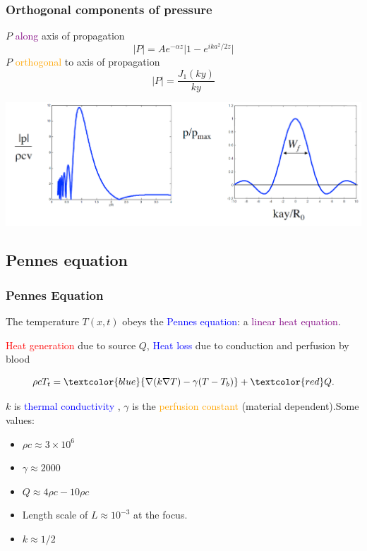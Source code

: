 \documentclass{beamer}
\begin{document}
\begin{frame}
\frametitle{Orthogonal components of pressure}

$P$ \textcolor{purple}{along} axis of propagation
$$ |P| = Ae^{-\alpha z} \big|1-e^{i k a^2/2z}\big| $$
$P$ \textcolor{orange}{orthogonal} to axis of propagation
$$ |P| = \frac{J_1(ky)}{ky} $$

\begin{center}
\includegraphics[scale=0.15]{Pages/transducer2731.pdf}
\end{center}

\end{frame}


\subsection{Pennes equation}
\begin{frame}
\frametitle{Pennes Equation}

The temperature $T(x,t)$ obeys the \textcolor{blue}{Pennes equation}: a \textcolor{purple}{linear heat equation}.

\textcolor{red}{Heat generation} due to source $Q$, \textcolor{blue}{Heat loss} due to conduction and perfusion by blood

$$\rho c T_t = \textcolor{blue}{\nabla (k \nabla T) - \gamma (T- T_b)} +\textcolor{red} Q.$$


$k$ is \textcolor{blue}{thermal conductivity} , $\gamma$ is the \textcolor{orange}{perfusion constant} (material dependent).Some values:

\begin{itemize}
\item $\rho c \approx 3 \times 10^6$
\item $\gamma \approx 2000$
\item $ Q \approx 4\rho c -10 \rho c $
\item Length scale of $L \approx 10^{-3}$ at the focus.
\item$k \approx 1/2$
\end{itemize}

\end{frame}
\end{document}
